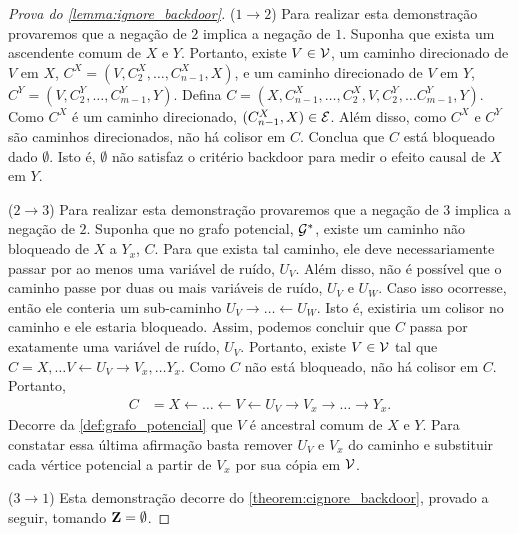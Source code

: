 \begin{proof}[Prova do \cref{lemma:ignore_backdoor}]
 ($1 \rightarrow 2$)
 Para realizar esta demonstração provaremos que
 a negação de $2$ implica a negação de $1$.
 Suponha que exista um ascendente comum de $X$ e $Y$.
 Portanto, existe $V \in {\mathcal V}$,
 um caminho direcionado de $V$ em $X$, 
 $C^X = (V, C^X_2, \ldots, C^X_{n-1},X)$, e
 um caminho direcionado de $V$ em $Y$,
 $C^Y = (V, C^Y_2, \ldots, C^Y_{m-1},Y)$.
 Defina
 $C = (X, C^X_{n-1}, \ldots, C^X_2, V, C^Y_2, \ldots C^Y_{m-1}, Y)$.
 Como $C^X$ é um caminho direcionado, $(C^X_{n-1}, X) \in {\mathcal E}$.
 Além disso, como $C^X$ e $C^Y$ são caminhos direcionados,
 não há colisor em $C$.
 Conclua que $C$ está bloqueado dado $\emptyset$.
 Isto é, $\emptyset$ não satisfaz o critério backdoor
 para medir o efeito causal de $X$ em $Y$.
 
 ($2 \rightarrow 3$)
 Para realizar esta demonstração provaremos que
 a negação de $3$ implica a negação de $2$.
 Suponha que no grafo potencial, ${\mathcal G}^*$,
 existe um caminho não bloqueado de $X$ a $Y_x$, $C$.
 Para que exista tal caminho, 
 ele deve necessariamente passar por ao menos uma variável de ruído, $U_V$.
 Além disso, não é possível que o caminho passe por duas ou mais variáveis de ruído,
 $U_V$ e $U_W$. Caso isso ocorresse, então ele conteria um sub-caminho
 $U_V \rightarrow \ldots \leftarrow U_W$.
 Isto é, existiria um colisor no caminho e ele estaria bloqueado.
 Assim, podemos concluir que $C$ passa por exatamente uma variável de ruído, $U_V$.
 Portanto, existe $V \in {\mathcal V}$ tal que
 $C = X, \ldots V \leftarrow U_V \rightarrow V_x, \ldots Y_x$.
 Como $C$ não está bloqueado, não há colisor em $C$.
 Portanto,
 \begin{align*}
  C &= X \leftarrow \ldots \leftarrow V \leftarrow U_V 
  \rightarrow V_x \rightarrow \ldots \rightarrow Y_x.
 \end{align*}
 Decorre da \cref{def:grafo_potencial} que
 $V$ é ancestral comum de $X$ e $Y$.
 Para constatar essa última afirmação basta
 remover $U_V$ e $V_x$ do caminho e
 substituir cada vértice potencial 
 a partir de $V_x$ por sua cópia em ${\mathcal V}$.
 
 ($3 \rightarrow 1$)
 Esta demonstração decorre do \cref{theorem:cignore_backdoor},
 provado a seguir, tomando ${\mathbf{Z}} = \emptyset$.
\end{proof}

